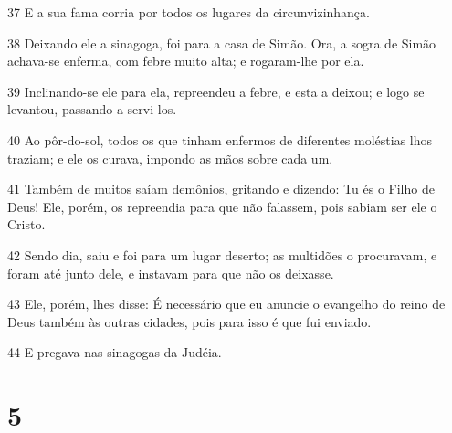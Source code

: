 \par 37 E a sua fama corria por todos os lugares da circunvizinhança.
\par 38 Deixando ele a sinagoga, foi para a casa de Simão. Ora, a sogra de Simão achava-se enferma, com febre muito alta; e rogaram-lhe por ela.
\par 39 Inclinando-se ele para ela, repreendeu a febre, e esta a deixou; e logo se levantou, passando a servi-los.
\par 40 Ao pôr-do-sol, todos os que tinham enfermos de diferentes moléstias lhos traziam; e ele os curava, impondo as mãos sobre cada um.
\par 41 Também de muitos saíam demônios, gritando e dizendo: Tu és o Filho de Deus! Ele, porém, os repreendia para que não falassem, pois sabiam ser ele o Cristo.
\par 42 Sendo dia, saiu e foi para um lugar deserto; as multidões o procuravam, e foram até junto dele, e instavam para que não os deixasse.
\par 43 Ele, porém, lhes disse: É necessário que eu anuncie o evangelho do reino de Deus também às outras cidades, pois para isso é que fui enviado.
\par 44 E pregava nas sinagogas da Judéia.

\chapter{5}

